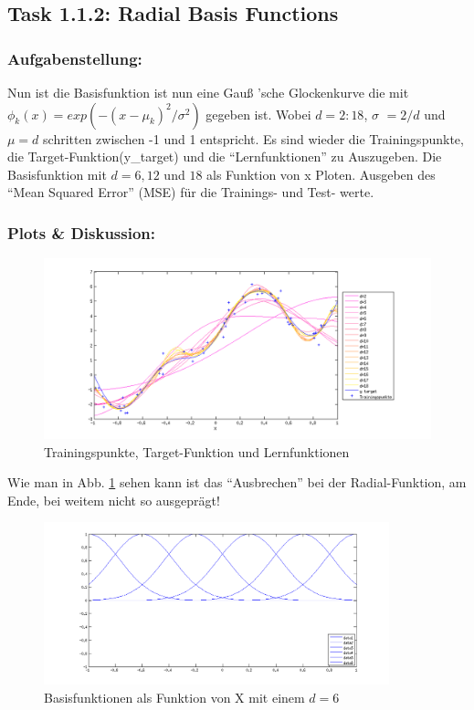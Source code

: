 \subsection{Task 1.1.2: Radial Basis Functions}


\subsubsection{Aufgabenstellung:}
Nun ist die Basisfunktion ist nun eine Gau\ss{} 'sche Glockenkurve die mit $\phi_k(x) = exp(-(x-\mu_k)^2 /\sigma^2 )$ gegeben ist.
Wobei $d=2:18$, $\sigma$ $= 2/d$ und $\mu =d$ schritten zwischen -1 und 1 entspricht.
Es sind wieder  die Trainingspunkte, die Target-Funktion(y\_target) und die ``Lernfunktionen'' zu Auszugeben.
Die Basisfunktion mit $d=6,12$ und $18$ als Funktion von x Ploten.
Ausgeben des ``Mean Squared Error'' (MSE) für die Trainings- und Test- werte.



\subsubsection{Plots \& Diskussion:}


\begin{figure}[hp!]
\begin{center}
 \includegraphics[width=1\textwidth]{./figures/RBF_learn}
 \caption[Trainingspunkte, Target-Funktion und Lernfunktionen]{Trainingspunkte, Target-Funktion und Lernfunktionen}
\label{fig:RBF_learn}
\end{center}
\end{figure}
Wie man in Abb. \ref{fig:RBF_learn} sehen kann ist das ``Ausbrechen'' bei der Radial-Funktion, am Ende, bei weitem nicht so ausgeprägt!

\clearpage
\begin{figure}[hp!]
\begin{center}
 \includegraphics[width=10cm]{./figures/RBF_6}
 \caption[Basisfunktionen als Funktion von X (d=6)]{Basisfunktionen als Funktion von X mit einem $d=6$}
\label{fig:RBF_6}
\end{center}
\end{figure}

